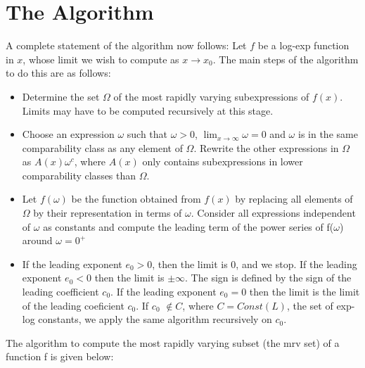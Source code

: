 \section{The Algorithm}
A complete statement of the algorithm now follows:
Let $f$ be a log-exp function in $x$, whose limit we wish to compute as $x\rightarrow x_0.$ The main steps of the algorithm to do this are as follows: \\
\begin{itemize}
\item{Determine the set $\Omega$ of the most rapidly varying subexpressions of $f(x)$. Limits may have to be computed recursively at this stage.}
\item{Choose an expression $\omega$ such that $\omega>0$, $\lim_{x \rightarrow \infty} \omega=0 $ and $\omega$ is in the same comparability class as any element of $\Omega$. Rewrite the other expressions in $\Omega$ as $A(x)\omega^{c}$, where $A(x)$ only contains subexpressions in lower comparability classes than $\Omega$.}
\item{Let $f(\omega)$ be the function obtained from $f(x)$ by replacing all elements of $\Omega $ by their representation in terms of $\omega$. Consider all expressions independent of $\omega$ as constants and compute the leading term of the power series of f($\omega$) around $\omega=0^{+}$ }
\item{If the leading exponent $e_0>0$, then the limit is 0, and we stop. If the leading exponent $e_0<0$ then the limit is $\pm \infty$. The sign is defined by the sign of the leading coefficient $c_0$. If the leading exponent $e_0=0$ then the limit is the limit of the leading coeficient $c_0$. If $c_0$ $\not \in C$, where $C=Const(L)$, the set of exp-log constants, we apply the same algorithm recursively on $c_0$.} \\
\end{itemize}
The algorithm to compute the most rapidly varying subset (the mrv set) of a function f is given below:\\
